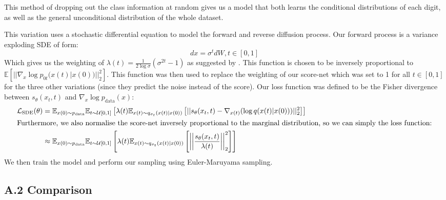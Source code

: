 This method of dropping out the class information at random gives us a model
that both learns the conditional distributions of each digit, as well as the
general unconditional distribution of the whole dataset.


This variation uses a stochastic differential equation to model the forward and reverse diffusion process. 
Our forward process is a variance exploding SDE of form:
\begin{equation}
  dx = \sigma ^ t dW, t \in [0, 1]
\end{equation}
Which gives us the weighting of
$\lambda(t) = \frac{1}{2 \log \sigma} (\sigma^{2t}-1)$ as suggested by \cite{yang_song}.
This function is chosen to be inversely proportional to $\mathbb{E}[||\nabla_x \log p_{0t}(x(t) | x(0))||^2_2]$.
This function was then used to replace the weighting of our score-net
which was set to 1 for all $t \in [0, 1]$ for the three other variations (since they predict the noise instead of the score).
Our loss function was defined to be the Fisher divergence between $s_\theta(x_t, t)$ and $\nabla_x \log p_{\text{data}}(x)$:
\begin{align}
  \mathcal{L}_\text{SDE}(\theta) &= \mathbb{E}_{x(0) \sim p_\text{data}} \mathbb{E}_{t \sim \mathcal{U}[0, 1]} \left[ 
  \lambda(t) \mathbb{E}_{x(t) \sim q_{\sigma_t}(x(t) | x(0))} \left[
    ||s_\theta (x_t, t) - \nabla_{x(t)} (\log q(x(t) | x(0)))||^2_2
    \right]\right]\\
  \intertext{Furthermore, we also normalise the score-net
  inversely proportional to the marginal distribution, so we can simply the loss function:}
    &\approx \mathbb{E}_{x(0) \sim p_\text{data}} \mathbb{E}_{t \sim \mathcal{U}[0, 1]} \left[ 
  \lambda(t) \mathbb{E}_{x(t) \sim q_{\sigma_t}(x(t) | x(0))} \left[
    \left|\left|\frac{s_\theta(x_t, t)}{\lambda(t)}\right|\right|^2_2
    \right]\right]
\end{align}
We then train the model and perform our sampling using Euler-Maruyama sampling.

\subsection{A.2 Comparison}

